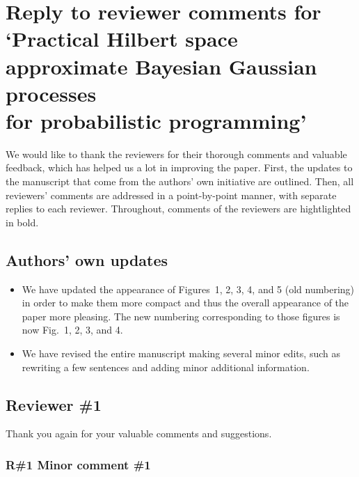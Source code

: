 \documentclass[11pt]{report}
\begin{document}
\section*{\normalsize Reply to reviewer comments for \\ \Large`Practical Hilbert space approximate Bayesian Gaussian processes \\ for probabilistic programming'}

We would like to thank the reviewers for their thorough comments and valuable feedback, which has helped us a lot in improving the paper. First, the updates to the manuscript that come from the authors' own initiative are outlined. Then, all reviewers' comments are addressed in a point-by-point manner, with separate replies to each reviewer. 
Throughout, comments of the reviewers are hightlighted in bold.

\noindent \hdashrule{\textwidth}{0.2pt}{2mm 1pt}

\subsection*{Authors' own updates}

\begin{itemize}

\item We have updated the appearance of Figures~1, 2, 3, 4, and 5 (old numbering) in order to make them more compact and thus the overall appearance of the paper more pleasing. The new numbering corresponding to those figures is now Fig.~1, 2, 3, and 4.

\item We have revised the entire manuscript making several minor edits, such as rewriting a few sentences and adding minor additional information.

\end{itemize}

\noindent \hdashrule{\textwidth}{0.2pt}{2mm 1pt}

\subsection*{Reviewer \#1}

Thank you again for your valuable comments and suggestions.

\subsubsection*{R\#1 Minor comment \#1}
\end{document}
